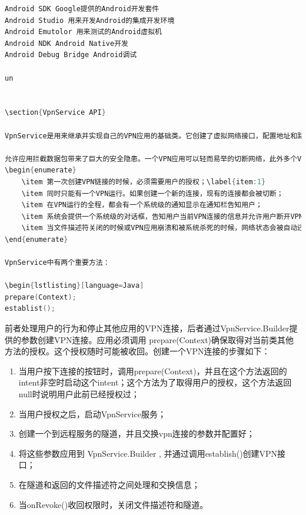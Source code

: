\documentclass[format=final, language=chinese, degree=fyp]{hustthesis}
\begin{document}
\begin{lstlisting}[language=c]
Android SDK Google提供的Android开发套件
Android Studio 用来开发Android的集成开发环境
Android Emutolor 用来测试的Android虚拟机
Android NDK Android Native开发
Android Debug Bridge Android调试

un


\section{VpnService API}

VpnService是用来继承并实现自己的VPN应用的基础类。它创建了虚拟网络接口，配置地址和路由规则，返回一个文件描述符给应用。对文件描述符每一次读，就会读取一个通过这个接口向外发出的数据包；对文件描述符的每一次写，就会插入一个入数据包，对接口而言，就相当于这个接口接收到了这个数据包／这个虚拟网络接口运行于IP协议层，所以数据包的 开头都是IP数据头。通过这个API，应用可以实现在隧道中与远程服务器的数据包处理和交换，构造一个VPN应用。

允许应用拦截数据包带来了巨大的安全隐患。一个VPN应用可以轻而易举的切断网络，此外多个VPN应用也可能互相冲突。系统采取了多种措施来解决这个问题。主要是：
\begin{enumerate}
 	\item 第一次创建VPN链接的时候，必须需要用户的授权；\label{item:1}
	\item 同时只能有一个VPN运行。如果创建一个新的连接，现有的连接都会被切断；
	\item 在VPN运行的全程，都会有一个系统级的通知显示在通知栏告知用户；
	\item 系统会提供一个系统级的对话框，告知用户当前VPN连接的信息并允许用户断开VPN连接；
	\item 当文件描述符关闭的时候或VPN应用崩溃和被系统杀死的时候，网络状态会被自动还原。
\end{enumerate}

VpnService中有两个重要方法：

\begin{lstlisting}[language=Java]
prepare(Context);
establist();
\end{lstlisting}

前者处理用户的行为和停止其他应用的VPN连接，后者通过VpnService.Builder提供的参数创建VPN连接。应用必须调用 prepare(Context)确保取得对当前类其他方法的授权。这个授权随时可能被收回。创建一个VPN连接的步骤如下：
 \begin{enumerate}
     \item 当用户按下连接的按钮时，调用prepare(Context)，并且在这个方法返回的intent非空时启动这个intent；这个方法为了取得用户的授权，这个方法返回null时说明用户此前已经授权过；
     \item 当用户授权之后，启动VpnService服务；
     \item 创建一个到远程服务的隧道，并且交换vpn连接的参数并配置好；
     \item 将这些参数应用到 VpnService.Builder , 并通过调用establish()创建VPN接口；
     \item 在隧道和返回的文件描述符之间处理和交换信息；
     \item 当onRevoke()收回权限时，关闭文件描述符和隧道。
\end{enumerate}
\end{document}
